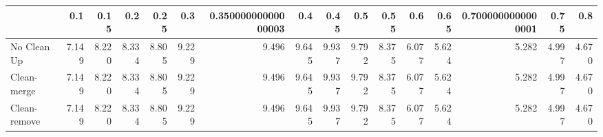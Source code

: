 \begin{tabular}{lrrrrrrrrrrrrrrr}
\toprule
{} &   0.1 &  0.15 &   0.2 &  0.25 &   0.3 & 0.35000000000000003 &   0.4 &  0.45 &   0.5 &  0.55 &   0.6 &  0.65 & 0.7000000000000001 &  0.75 &   0.8 \\
\midrule
No Clean Up  & 7.149 & 8.220 & 8.334 & 8.805 & 9.229 &               9.496 & 9.645 & 9.937 & 9.792 & 8.375 & 6.077 & 5.624 &              5.282 & 4.997 & 4.670 \\
Clean-merge  & 7.149 & 8.220 & 8.334 & 8.805 & 9.229 &               9.496 & 9.645 & 9.937 & 9.792 & 8.375 & 6.077 & 5.624 &              5.282 & 4.997 & 4.670 \\
Clean-remove & 7.149 & 8.220 & 8.334 & 8.805 & 9.229 &               9.496 & 9.645 & 9.937 & 9.792 & 8.375 & 6.077 & 5.624 &              5.282 & 4.997 & 4.670 \\
\bottomrule
\end{tabular}
